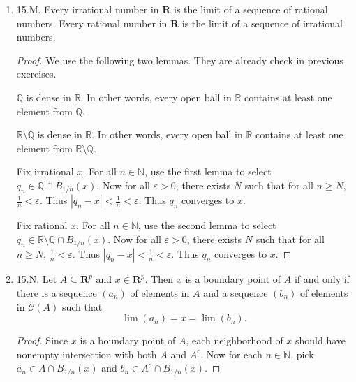 \begin{enumerate}
\begin{proof}
\begin{lemma}
\begin{proof}
		Since $c^{1 / n}$ is a decreasing function of $n$, we have, for all $n \ge N$, \[
			c^{1 / n} \le c^{1 / N} < 1 + \varepsilon
		.\] 

		Hence for all $N \ge n$, \[
			1 <  c^{1 / n} \le  1 + \varepsilon 
		.\] 
		By squeeze theorem, $c^{1 / n} \to  1$.
	\end{proof}
	
\end{lemma}
	
\end{proof}

\item 15.M. Every irrational number in $\boldsymbol{R}$ is the limit of a sequence of rational numbers. Every rational number in $\boldsymbol{R}$ is the limit of a sequence of irrational numbers.
\begin{proof}
	We use the following two lemmas. They are already check in previous exercises.
\begin{lemma}
	$\mathbb{Q}$ is dense in $\mathbb{R}$. In other words, every open ball in $\mathbb{R}$ contains at least one element from $\mathbb{Q}$.
\end{lemma}

\begin{lemma}
	$\mathbb{R} \setminus \mathbb{Q}$ is dense in $\mathbb{R}$. In other words, every open ball in $\mathbb{R}$ contains at least one element from $\mathbb{R}\setminus \mathbb{Q}$.
\end{lemma}

Fix irrational $x$. For all $n \in \mathbb{N}$, use the first lemma to select $q_n \in \mathbb{Q} \cap B_{1 / n}(x)$. 
Now for all $\varepsilon>0$, there exists $N$ such that for all $n \ge N$, $\frac{1}{n} < \varepsilon$. Thus $|q_n - x| < \frac{1}{n} < \varepsilon$. Thus $q_n$ converges to $x$.


Fix rational $x$. For all $n \in \mathbb{N}$, use the second lemma to select $q_n \in \mathbb{R}\setminus \mathbb{Q} \cap B_{1 / n}(x)$. 
Now for all $\varepsilon>0$, there exists $N$ such that for all $n \ge N$, $\frac{1}{n} < \varepsilon$. Thus $|q_n - x| < \frac{1}{n} < \varepsilon$. Thus $q_n$ converges to $x$.
\end{proof}

\item 15.N. Let $A \subseteq \mathbf{R}^p$ and $x \in \mathbf{R}^p$. Then $x$ is a boundary point of $A$ if and only if there is a sequence $\left(a_n\right)$ of elements in $A$ and a sequence $\left(b_n\right)$ of elements in $\mathscr{C}(A)$ such that
\[
\lim \left(a_n\right)=x=\lim \left(b_n\right) .
\]
\begin{proof}
	Since $x$ is a boundary point of $A$, each neighborhood of $x$ should have nonempty intersection with both $A$ and $A^{c} $. Now for each $n \in \mathbb{N}$, pick $a_n \in A \cap B_{1 / n}(x)$ and $b_n \in A^{c}  \cap B_{1 / n}(x)$. 


\end{proof}
\end{enumerate}
